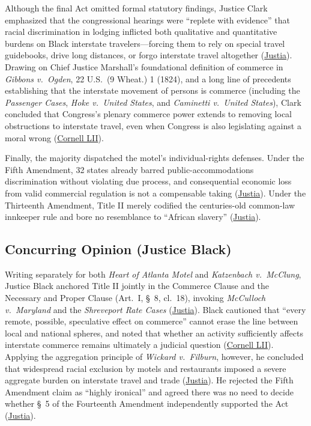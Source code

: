 \documentclass[12pt]{article}
\begin{document}
Although the final Act omitted formal statutory findings, Justice Clark emphasized that the congressional hearings were ``replete with evidence'' that racial discrimination in lodging inflicted both qualitative and quantitative burdens on Black interstate travelers---forcing them to rely on special travel guidebooks, drive long distances, or forgo interstate travel altogether (\href{https://supreme.justia.com/cases/federal/us/379/241/}{Justia}). Drawing on Chief Justice Marshall's foundational definition of commerce in \textit{Gibbons v.\ Ogden}, 22 U.S.\ (9 Wheat.) 1 (1824), and a long line of precedents establishing that the interstate movement of persons is commerce (including the \textit{Passenger Cases}, \textit{Hoke v.\ United States}, and \textit{Caminetti v.\ United States}), Clark concluded that Congress's plenary commerce power extends to removing local obstructions to interstate travel, even when Congress is also legislating against a moral wrong (\href{https://www.law.cornell.edu/supremecourt/text/379/241}{Cornell LII}).

Finally, the majority dispatched the motel's individual-rights defenses. Under the Fifth Amendment, 32 states already barred public-accommodations discrimination without violating due process, and consequential economic loss from valid commercial regulation is not a compensable taking (\href{https://supreme.justia.com/cases/federal/us/379/241/}{Justia}). Under the Thirteenth Amendment, Title II merely codified the centuries-old common-law innkeeper rule and bore no resemblance to ``African slavery'' (\href{https://supreme.justia.com/cases/federal/us/379/241/}{Justia}).

\subsection{Concurring Opinion (Justice Black)}
Writing separately for both \textit{Heart of Atlanta Motel} and \textit{Katzenbach v.\ McClung}, Justice Black anchored Title II jointly in the Commerce Clause and the Necessary and Proper Clause (Art.\ I, \S~8, cl.\ 18), invoking \textit{McCulloch v.\ Maryland} and the \textit{Shreveport Rate Cases} (\href{https://supreme.justia.com/cases/federal/us/379/241/}{Justia}). Black cautioned that ``every remote, possible, speculative effect on commerce'' cannot erase the line between local and national spheres, and noted that whether an activity sufficiently affects interstate commerce remains ultimately a judicial question (\href{https://www.law.cornell.edu/supremecourt/text/379/241}{Cornell LII}). Applying the aggregation principle of \textit{Wickard v.\ Filburn}, however, he concluded that widespread racial exclusion by motels and restaurants imposed a severe aggregate burden on interstate travel and trade (\href{https://supreme.justia.com/cases/federal/us/379/241/}{Justia}). He rejected the Fifth Amendment claim as ``highly ironical'' and agreed there was no need to decide whether \S~5 of the Fourteenth Amendment independently supported the Act (\href{https://supreme.justia.com/cases/federal/us/379/241/}{Justia}).
\end{document}
